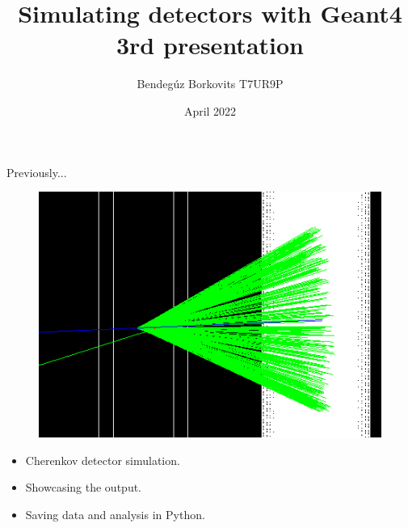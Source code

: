 \documentclass[11pt]{beamer}
\author{Bendegúz Borkovits T7UR9P}
\title{Simulating detectors with Geant4 3rd presentation}
\institute{Scientific Modeling Computer Laboratory}
\date{April 2022}
\begin{document}
\begin{frame}
\titlepage
\end{frame}

\begin{frame}{Previously...}
    \begin{figure}
        \centering
        \includegraphics[scale = 0.8]{sensitive_detectors.png}
    \end{figure}
    \begin{itemize}
        \item<tri@1-> Cherenkov detector simulation.
        \vspace{0.2 cm}
        \item<tri@1-> Showcasing the output.
        \vspace{0.2 cm}
        \item<tri@1-> Saving data and analysis in Python.
    \end{itemize}
\end{frame}
\end{document}
